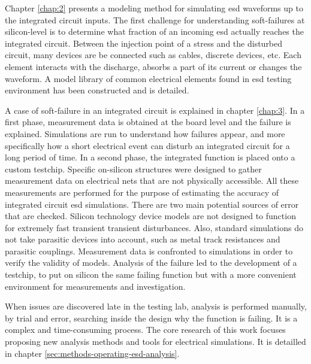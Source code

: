 %
Chapter \ref{chap:2} presents a modeling method for simulating \gls{esd} waveforms up to the integrated circuit inputs.
The first challenge for understanding soft-failures at silicon-level is to determine what fraction of an incoming \gls{esd} actually reaches the integrated circuit.
Between the injection point of a stress and the disturbed circuit, many devices are be connected such as cables, discrete devices, etc.
Each element interacts with the discharge, absorbs a part of its current or changes the waveform.
A model library of common electrical elements found in \gls{esd} testing environment has been constructed and is detailed.

%
A case of soft-failure in an integrated circuit is explained in chapter \ref{chap:3}.
In a first phase, measurement data is obtained at the board level and the failure is explained.
Simulations are run to understand how failures appear, and more specifically how a short electrical event can disturb an integrated circuit for a long period of time.
In a second phase, the integrated function is placed onto a custom testchip.
Specific on-silicon structures were designed to gather measurement data on electrical nets that are not physically accessible.
All these measurements are performed for the purpose of estimating the accuracy of integrated circuit \gls{esd} simulations.
There are two main potential sources of error that are checked.
Silicon technology device models are not designed to function for extremely fast transient transient disturbances.
Also, standard simulations do not take parasitic devices into account, such as metal track resistances and parasitic couplings.
Measurement data is confronted to simulations in order to verify the validity of models.
Analysis of the failure led to the development of a testchip, to put on silicon the same failing function but with a more convenient environment for measurements and investigation.

%
When issues are discovered late in the testing lab, analysis is performed manually, by trial and error, searching inside the design why the function is failing.
It is a complex and time-consuming process.
The core research of this work focuses proposing new analysis methods and tools for electrical simulations.
It is detailled in chapter \ref{sec:methods-operating-esd-analysis}.

